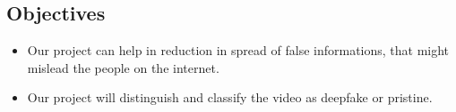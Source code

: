 \subsection{Objectives}
\justify
\begin{itemize}
    \item Our project can help in  reduction in spread of false informations, that might mislead the people on the internet.
    \item Our project will distinguish and classify the video as deepfake or pristine.
\end{itemize}
